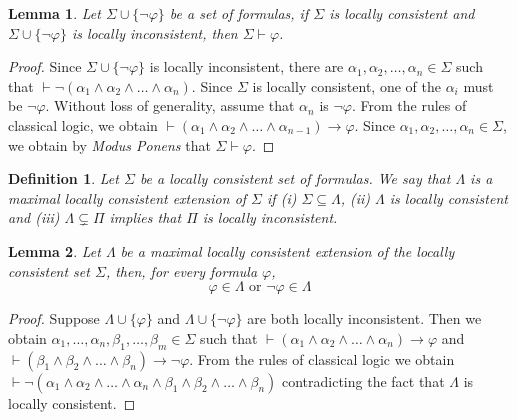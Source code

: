 \documentclass{amsart}
\newtheorem{definition}{Definition}[section]
\newtheorem{lemma}{Lemma}[section]
\newcommand{\so}{\rightarrow}
\begin{document}
\begin{lemma}\label{proofByContradiction}
    Let $\Sigma \cup \{\lnot \varphi\}$ be a set of formulas, if $\Sigma$ is locally consistent and $\Sigma \cup \{\lnot \varphi\}$ is locally inconsistent, then $\Sigma \vdash \varphi$.
\end{lemma}

\begin{proof}
    Since $\Sigma \cup \{\lnot \varphi\}$ is locally inconsistent, there are $\alpha_1, \alpha_2, \ldots, \alpha_n \in \Sigma$ such that $\vdash \lnot (\alpha_1 \land \alpha_2 \land \ldots \land \alpha_n)$. Since $\Sigma$ is locally consistent, one of the $\alpha_i$ must be $\lnot \varphi$. Without loss of generality, assume that $\alpha_n$ is $\lnot \varphi$. From the rules of classical logic, we obtain $\vdash (\alpha_1 \land \alpha_2 \land \ldots \land \alpha_{n-1}) \so \varphi$. Since $\alpha_1, \alpha_2, \ldots, \alpha_n \in \Sigma$, we obtain by \textit{Modus Ponens} that $\Sigma \vdash \varphi$.
\end{proof}

\begin{definition}
    Let $\Sigma$ be a locally consistent set of formulas. We say that $\Lambda$ is a \emph{maximal locally consistent extension of} $\Sigma$ if (i) $\Sigma \subseteq \Lambda$, (ii) $\Lambda$ is locally consistent and (iii) $\Lambda \subsetneq \Pi$ implies that $\Pi$ is locally inconsistent.
\end{definition}

\begin{lemma}\label{worldbivalence}
    Let $\Lambda$ be a maximal locally consistent extension of the locally consistent set $\Sigma$, then, for every formula $\varphi$,
    $$\varphi \in \Lambda \text{ or } \lnot \varphi \in \Lambda$$
\end{lemma}

\begin{proof}
    Suppose $\Lambda \cup \{\varphi\}$ and $\Lambda \cup \{\lnot \varphi\}$ are both locally inconsistent. Then we obtain $\alpha_1, \ldots, \alpha_n, \beta_1, \ldots, \beta_m \in \Sigma$ such that $\vdash (\alpha_1 \land \alpha_2 \land \ldots \land \alpha_n) \so \varphi$ and $\vdash (\beta_1 \land \beta_2 \land \ldots \land \beta_n) \so \lnot \varphi$. From the rules of classical logic we obtain $\vdash \lnot (\alpha_1 \land \alpha_2 \land \ldots \land \alpha_n \land \beta_1 \land \beta_2 \land \ldots \land \beta_n)$ contradicting the fact that $\Lambda$ is locally consistent. 
\end{proof}
\end{document}
